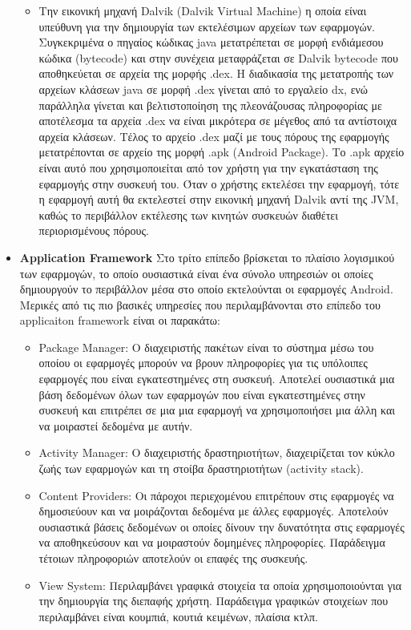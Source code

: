 \begin{itemize}
\begin{itemize}
		 		\item Την εικονική μηχανή Dalvik (Dalvik Virtual Machine) η οποία είναι υπεύθυνη για την δημιουργία των εκτελέσιμων αρχείων των εφαρμογών. Συγκεκριμένα ο πηγαίος κώδικας java μετατρέπεται σε μορφή ενδιάμεσου κώδικα (bytecode) και στην συνέχεια μεταφράζεται σε Dalvik bytecode που αποθηκεύεται σε αρχεία της μορφής .dex. Η διαδικασία της μετατροπής των αρχείων κλάσεων java σε μορφή .dex γίνεται από το εργαλείο dx, ενώ παράλληλα γίνεται και βελτιστοποίηση της πλεονάζουσας πληροφορίας με αποτέλεσμα τα αρχεία .dex να είναι μικρότερα σε μέγεθος από τα αντίστοιχα αρχεία κλάσεων. Τέλος το αρχείο .dex μαζί με τους πόρους της εφαρμογής μετατρέπονται σε αρχείο της μορφή .apk (Android Package). Το .apk αρχείο είναι αυτό που χρησιμοποιείται από τον χρήστη για την εγκατάσταση της εφαρμογής στην συσκευή του. Όταν ο χρήστης εκτελέσει την εφαρμογή, τότε η εφαρμογή αυτή θα εκτελεστεί στην εικονική μηχανή Dalvik αντί της JVM, καθώς το περιβάλλον εκτέλεσης των κινητών συσκευών διαθέτει περιορισμένους πόρους.
		 	\end{itemize}
		 	\item \textbf{Application Framework} Στο τρίτο επίπεδο βρίσκεται το πλαίσιο λογισμικού των εφαρμογών, το οποίο ουσιαστικά είναι ένα σύνολο υπηρεσιών οι οποίες δημιουργούν το περιβάλλον μέσα στο οποίο εκτελούνται οι εφαρμογές Android. Μερικές από τις πιο βασικές υπηρεσίες που περιλαμβάνονται στο επίπεδο του applicaiton framework είναι οι παρακάτω:
		 	\begin{itemize}
		 		\item Package Manager: Ο διαχειριστής πακέτων είναι το σύστημα μέσω του οποίου οι εφαρμογές μπορούν να βρουν πληροφορίες για τις υπόλοιπες εφαρμογές που είναι εγκατεστημένες στη συσκευή. Αποτελεί ουσιαστικά μια βάση δεδομένων όλων των εφαρμογών που είναι εγκατεστημένες στην συσκευή και επιτρέπει σε μια μια εφαρμογή να χρησιμοποιήσει μια άλλη και να μοιραστεί δεδομένα με αυτήν.
		 		\item Activity Manager: Ο διαχειριστής δραστηριοτήτων, διαχειρίζεται τον κύκλο ζωής των εφαρμογών και τη στοίβα δραστηριοτήτων (activity stack).
		 		\item Content Providers: Οι πάροχοι περιεχομένου επιτρέπουν στις εφαρμογές να δημοσιεύουν και να μοιράζονται δεδομένα με άλλες εφαρμογές. Αποτελούν ουσιαστικά βάσεις δεδομένων οι οποίες δίνουν την δυνατότητα στις εφαρμογές να αποθηκεύσουν και να μοιραστούν δομημένες πληροφορίες. Παράδειγμα τέτοιων πληροφοριών αποτελούν οι επαφές της συσκευής.
		 		\item View System: Περιλαμβάνει γραφικά στοιχεία τα οποία χρησιμοποιούνται για την δημιουργία της διεπαφής χρήστη. Παράδειγμα γραφικών στοιχείων που περιλαμβάνει είναι κουμπιά, κουτιά κειμένων, πλαίσια κτλπ.

\end{itemize}
\end{itemize}

